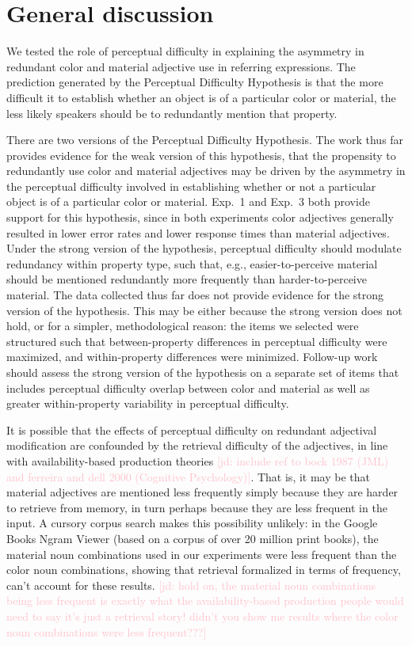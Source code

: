 \documentclass[12pt,letterpaper]{article}
\newcommand{\jd}[1]{\textcolor{Pink}{[jd: #1]}}
\begin{document}
\section{General discussion} 

We tested the role of perceptual difficulty in explaining the asymmetry in redundant color and material adjective use in referring expressions. The prediction generated by the Perceptual Difficulty Hypothesis is that the more difficult it to establish whether an object is of a particular color or material, the less likely speakers should be to redundantly mention that property.

There are two versions of the Perceptual Difficulty Hypothesis. The work thus far provides evidence for the weak version of this hypothesis, that the propensity to redundantly use color and material adjectives may be driven by the asymmetry in the perceptual difficulty involved in establishing whether or not a particular object is of a particular color or material. Exp.~1 and Exp.~3 both provide support for this hypothesis, since in both experiments color adjectives generally resulted in lower error rates and lower response times than material adjectives. Under the strong version of the hypothesis, perceptual difficulty should modulate redundancy within property type, such that, e.g., easier-to-perceive material should be mentioned redundantly more frequently than  harder-to-perceive material. The data collected thus far does not provide evidence for the strong version of the hypothesis. This may be either because the strong version does not hold, or for a simpler, methodological reason: the items we selected were structured such that between-property differences in perceptual difficulty were maximized, and within-property differences were minimized. Follow-up work should assess the strong version of the hypothesis on a separate set of items that includes perceptual difficulty overlap between color and material as well as greater within-property variability in perceptual difficulty. 

It is possible that the effects of perceptual difficulty on redundant adjectival modification are confounded by the retrieval difficulty of the adjectives, in line with availability-based production theories \jd{include ref to bock 1987 (JML) and ferreira and dell 2000 (Cognitive Psychology)}. That is, it may be that material adjectives are mentioned less frequently simply because they are harder to retrieve from memory, in turn perhaps because they are less frequent in the input. A cursory corpus search makes this possibility unlikely: in the Google Books Ngram Viewer (based on a corpus of over 20 million print books), the material noun combinations used in our experiments were less frequent than the color noun combinations, showing that retrieval formalized in terms of frequency, can't account for these results. \jd{hold on, the material noun combinations being less frequent is exactly what the availability-based production people would need to say it's just a retrieval story! didn't you show me results where the color noun combinations were less frequent???}
\end{document}

